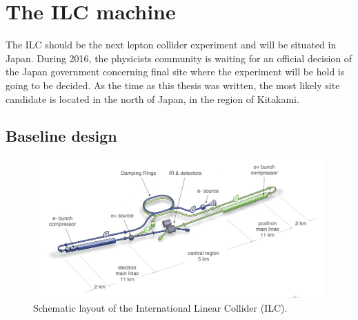 
  \section{The ILC machine}
  
    The \gls{ILC} should be the next lepton collider experiment and will be situated in Japan.
    During 2016, the physicists community is waiting for an official decision of the Japan government concerning final site where the experiment will be hold is going to be decided.
    As the time as this thesis was written, the most likely site candidate is located in the north of Japan, in the region of Kitakami. 
    
    \subsection{Baseline design}

   \begin{figure}[!h]
      \centering
      \includegraphics[width = 16 cm]{Pictures/ILC/ILC_new.png}
      \caption{Schematic layout of the International Linear Collider (ILC).\cite{Behnke2013}}
      \label{fig:ILC}
    \end{figure}


